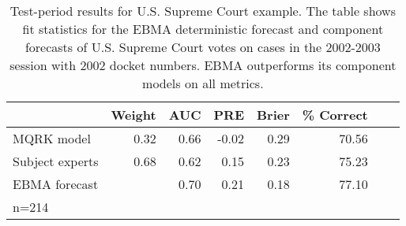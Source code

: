 \begin{table}[p]
  \caption{\footnotesize Test-period results for U.S. Supreme Court
    example.  The table shows fit statistics for the EBMA deterministic
    forecast and component forecasts of U.S. Supreme Court votes on
    cases in the 2002-2003 session with 2002 docket numbers.   EBMA 
    outperforms its component models on all metrics. }
\label{SC-Res} \small
\begin{center}
\begin{tabular}{lrrrrrrr}
\toprule
 & Weight & AUC & PRE & Brier & \% Correct   \\ 
\midrule
MQRK model& 0.32  &0.66 & -0.02 & 0.29 & 70.56  \\ 
Subject experts & 0.68 &0.62 & 0.15 & 0.23 & 75.23 \\ 
EBMA forecast&  & 0.70 & 0.21 & 0.18 & 77.10  \\ 
\bottomrule
n=214 
\end{tabular}
\end{center}
\end{table}
